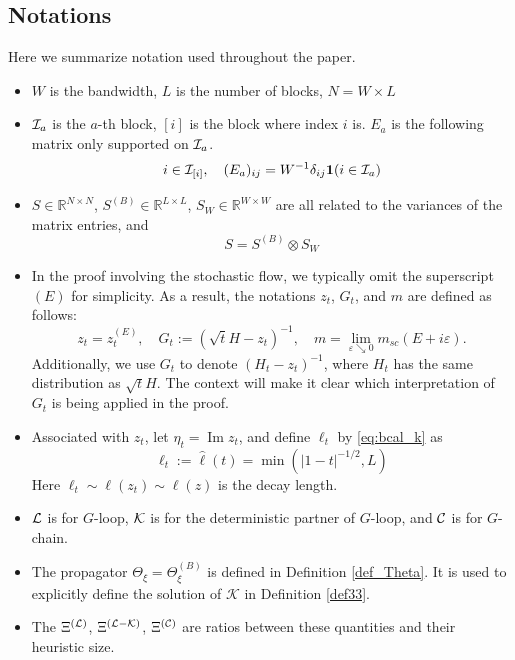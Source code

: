 \documentclass[10pt,reqno]{article}
\DeclareMathOperator{\im}{{\mathrm{Im}}}
\theoremstyle{plain} %
\theoremstyle{remark}
\numberwithin{equation}{section}
\begin{document}
\subsection{Notations}
Here we summarize  notation used throughout the paper. 
\begin{itemize}
    \item $W$ is the bandwidth, $L$ is the number of blocks, $N=W\times L$
    \item ${\cal I}_a$ is the $a$-th block, $[i]$ is the block where index $i$ is. $E_a$ is the following matrix only supported on ${\cal I}_a$. 
    $$
    i\in {\cal I}_{[i]}, \quad (E_a)_{ij}=W^{-1}\delta_{ij}{\bf 1}(i\in {\cal I}_a)$$
    \item $S\in \mathbb R^{N\times N}$, $S^{(B)}\in \mathbb R^{L\times L}$, $S_W\in \mathbb R^{W\times W}$ are all related to the variances of the matrix entries, and 
    $$
S= S^{(B)}\otimes S_{W}
$$
\item In the proof involving the stochastic flow, we typically omit the superscript $(E)$ for simplicity. As a result, the notations $z_t$, $G_t$, and $m$ are defined as follows:
\[
z_t = z_t^{(E)}, \quad G_t := (\sqrt{t} H - z_t)^{-1}, \quad m = \lim_{\varepsilon \searrow 0} m_{sc}(E + i \varepsilon).
\]
Additionally, we use $G_t$ to denote $(H_t - z_t)^{-1}$, where $H_t$ has the same distribution as $\sqrt{t} H$. The context will make it clear which interpretation of $G_t$ is being applied in the proof.
\item Associated with $z_t$, let $\eta_t=\im z_t$, and define $\ell_t$ by \eqref{eq:bcal_k} as
$$ \ell_t:=\hat \ell(t)=\min(|1-t|^{-1/2}, L)$$
Here $\ell_t\sim \ell(z_t)\sim \ell(z)$ is  the decay  length. 

    \item $\cal L$ is for $G$-loop, $\cal K$ is  for the deterministic partner of $G$-loop,  and $\cal C$ is for $G$-chain. 

    \item The propagator $\Theta_\xi = \Theta^{(B)}_{\xi}$ is defined in Definition \ref{def_Theta}. It is used to explicitly define the solution of $\mathcal{K}$ in Definition \ref{def33}.

    
    \item The $\Xi^{({\cal L})}$, $\Xi^{({\cal L-K})}$, $\Xi^{({\cal C})}$ are ratios between these quantities and their heuristic size.  
    

\end{itemize}
\end{document}
